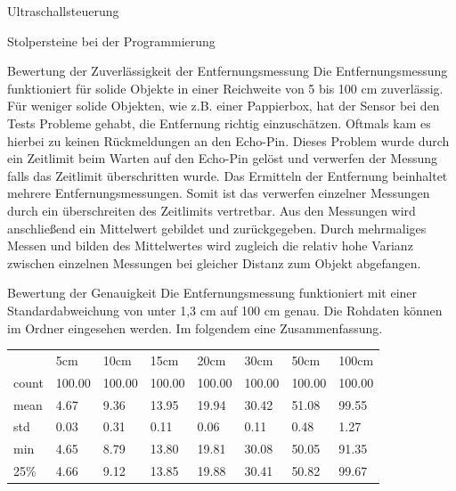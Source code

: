 \documentclass[12pt]{report}
\begin{document}
\begin{section}{Ultraschallsteuerung}
\begin{subsection}{Stolpersteine bei der Programmierung}
    \end{subsection}

    \begin{subsection}{Bewertung der Zuverlässigkeit der Entfernungsmessung}
      Die Entfernungsmessung funktioniert für solide Objekte in einer Reichweite
      von 5 bis 100 cm zuverlässig. Für weniger solide Objekten, wie z.B. einer
      Pappierbox, hat der Sensor bei den Tests Probleme
      gehabt, die Entfernung richtig einzuschätzen. Oftmals kam es hierbei zu keinen Rückmeldungen an den Echo-Pin. Dieses
      Problem wurde durch ein Zeitlimit beim Warten auf den Echo-Pin gelöst und
      verwerfen der Messung falls das Zeitlimit überschritten wurde. Das
      Ermitteln der Entfernung beinhaltet mehrere Entfernungsmessungen. Somit
      ist das verwerfen einzelner Messungen durch ein überschreiten des
      Zeitlimits vertretbar. Aus den Messungen wird anschließend ein Mittelwert
      gebildet und zurückgegeben. Durch mehrmaliges Messen und bilden des
      Mittelwertes wird zugleich die relativ hohe Varianz zwischen einzelnen
      Messungen bei gleicher Distanz zum Objekt abgefangen.
    \end{subsection}
    \begin{subsection}{Bewertung der Genauigkeit}
      Die Entfernungsmessung funktioniert mit einer Standardabweichung von unter
      1,3 cm auf 100 cm genau.
      Die Rohdaten können im Ordner
       eingesehen werden.
      Im folgendem eine Zusammenfassung.
      \begin{table}[h!]
        \begin{tabularx}{\textwidth}{XXXXXXXX}
            {} &     5cm &    10cm &    15cm &    20cm &    30cm &    50cm &   100cm \\
            count &  100.00 &  100.00 &  100.00 &  100.00 &  100.00 &  100.00 &  100.00 \\
            mean  &    4.67 &    9.36 &   13.95 &   19.94 &   30.42 &   51.08 &   99.55 \\
            std   &    0.03 &    0.31 &    0.11 &    0.06 &    0.11 &    0.48 &    1.27 \\
            min   &    4.65 &    8.79 &   13.80 &   19.81 &   30.08 &   50.05 &   91.35 \\
            25\%   &    4.66 &    9.12 &   13.85 &   19.88 &   30.41 &   50.82 &   99.67 \\

\end{tabularx}
\end{table}
\end{subsection}
\end{section}
\end{document}
